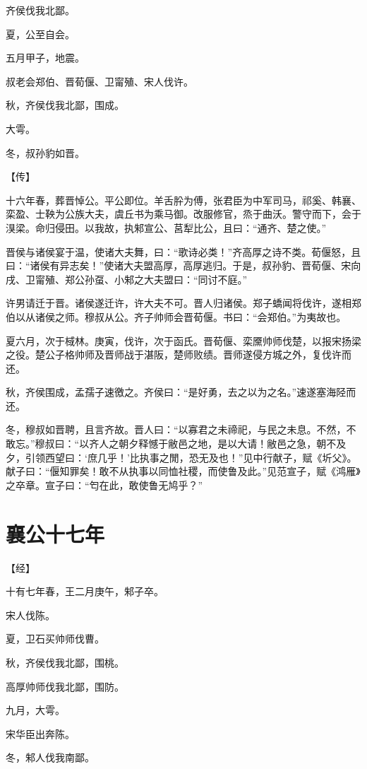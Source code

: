 \documentclass[a4paper,12pt,UTF8,twoside]{ctexbook}
\begin{document}
齐侯伐我北鄙。

夏，公至自会。

五月甲子，地震。

叔老会郑伯、晋荀偃、卫甯殖、宋人伐许。

秋，齐侯伐我北鄙，围成。

大雩。

冬，叔孙豹如晋。

【传】

十六年春，葬晋悼公。平公即位。羊舌肸为傅，张君臣为中军司马，祁奚、韩襄、栾盈、士鞅为公族大夫，虞丘书为乘马御。改服修官，烝于曲沃。警守而下，会于湨梁。命归侵田。以我故，执邾宣公、莒犁比公，且曰：“通齐、楚之使。”

晋侯与诸侯宴于温，使诸大夫舞，曰：“歌诗必类！”齐高厚之诗不类。荀偃怒，且曰：“诸侯有异志矣！”使诸大夫盟高厚，高厚逃归。于是，叔孙豹、晋荀偃、宋向戌、卫甯殖、郑公孙虿、小邾之大夫盟曰：“同讨不庭。”

许男请迁于晋。诸侯遂迁许，许大夫不可。晋人归诸侯。郑子蟜闻将伐许，遂相郑伯以从诸侯之师。穆叔从公。齐子帅师会晋荀偃。书曰：“会郑伯。”为夷故也。

夏六月，次于棫林。庚寅，伐许，次于函氏。晋荀偃、栾黡帅师伐楚，以报宋扬梁之役。楚公子格帅师及晋师战于湛阪，楚师败绩。晋师遂侵方城之外，复伐许而还。

秋，齐侯围成，孟孺子速徼之。齐侯曰：“是好勇，去之以为之名。”速遂塞海陉而还。

冬，穆叔如晋聘，且言齐故。晋人曰：“以寡君之未禘祀，与民之未息。不然，不敢忘。”穆叔曰：“以齐人之朝夕释憾于敝邑之地，是以大请！敝邑之急，朝不及夕，引领西望曰：‘庶几乎！’比执事之閒，恐无及也！”见中行献子，赋《圻父》。献子曰：“偃知罪矣！敢不从执事以同恤社稷，而使鲁及此。”见范宣子，赋《鸿雁》之卒章。宣子曰：“匄在此，敢使鲁无鸠乎？”

\section{襄公十七年}



【经】

十有七年春，王二月庚午，邾子卒。

宋人伐陈。

夏，卫石买帅师伐曹。

秋，齐侯伐我北鄙，围桃。

高厚帅师伐我北鄙，围防。

九月，大雩。

宋华臣出奔陈。

冬，邾人伐我南鄙。
\end{document}
